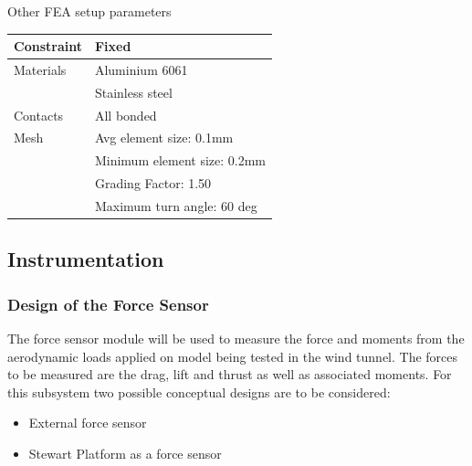 \begin{center}
\begin{table}[!h]
\caption[FEA Setup]{Other FEA setup parameters}
\centering
\end{table}
\begin{tabular}{|l|l|}
\hline
Constraint & Fixed\\
\hline
Materials & Aluminium 6061\\
 & Stainless steel\\
\hline
Contacts & All bonded\\
\hline
Mesh& Avg element size: 0.1mm\\
& Minimum element size: 0.2mm\\
& Grading Factor: 1.50\\
& Maximum turn angle: 60 deg\\
\hline
\end{tabular}
\end{center}

\subsection{Instrumentation}
\subsubsection{Design of the Force Sensor}
The force sensor module will be used to measure the force and moments from the aerodynamic loads applied on model being tested in the wind tunnel. The forces to be measured are the drag, lift and thrust as well as associated moments. For this subsystem two possible conceptual designs are to be considered:
\begin{itemize}
\item External force sensor
\item Stewart Platform as a force sensor
\end{itemize}
